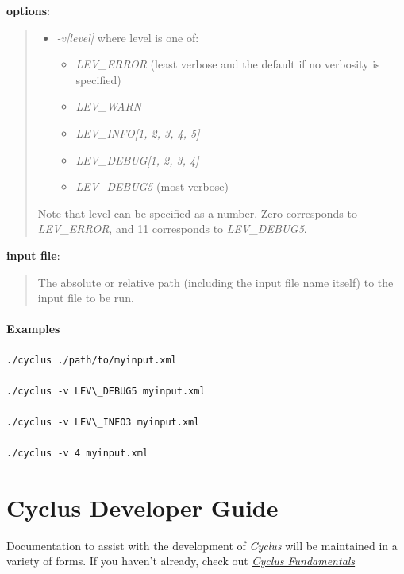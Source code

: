 \documentclass[letterpaper,10pt,english]{sphinxmanual}
\begin{document}
\textbf{options}:
\begin{quote}
\begin{itemize}
\item {} 
\emph{-v{[}level{]}} where level is one of:
\begin{itemize}
\item {} 
\emph{LEV\_ERROR} (least verbose and the default if no verbosity is specified)

\item {} 
\emph{LEV\_WARN}

\item {} 
\emph{LEV\_INFO{[}1, 2, 3, 4, 5{]}}

\item {} 
\emph{LEV\_DEBUG{[}1, 2, 3, 4{]}}

\item {} 
\emph{LEV\_DEBUG5} (most verbose)

\end{itemize}

\end{itemize}

Note  that level can be specified as a number. Zero corresponds to
\emph{LEV\_ERROR}, and 11 corresponds to \emph{LEV\_DEBUG5}.
\end{quote}

\textbf{input file}:
\begin{quote}

The absolute or relative path (including the input file name itself) to the
input file to be run.
\end{quote}


\paragraph{Examples}
\label{usrdoc/creating_and_running_sims:examples}
\begin{Verbatim}[commandchars=\\\{\}]
./cyclus ./path/to/myinput.xml

./cyclus -v LEV\_DEBUG5 myinput.xml

./cyclus -v LEV\_INFO3 myinput.xml

./cyclus -v 4 myinput.xml
\end{Verbatim}


\section{Cyclus Developer Guide}
\label{devdoc/main:cyclus-developer-guide}\label{devdoc/main::doc}
Documentation to assist with the development of \emph{Cyclus} will be maintained
in a variety of forms.  If you haven't already, check out
{\hyperref[basics/main::doc]{\emph{Cyclus Fundamentals}}}
\end{document}
